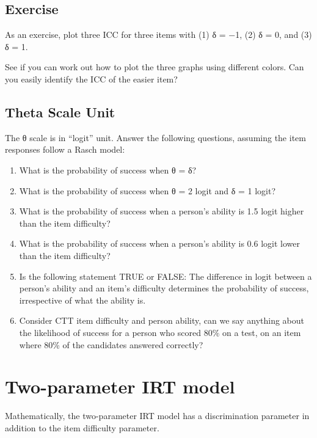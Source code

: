 \documentclass[
  letterpaper,
  DIV=11,
  numbers=noendperiod]{scrreprt}
\providecommand{\tightlist}{%
  \setlength{\itemsep}{0pt}\setlength{\parskip}{0pt}}\usepackage{longtable,booktabs,array}
\begin{document}
\hypertarget{exercise}{%
\section{Exercise}\label{exercise}}

As an exercise, plot three ICC for three items with (1) δ = −1, (2) δ =
0, and (3) δ = 1.

See if you can work out how to plot the three graphs using different
colors. Can you easily identify the ICC of the easier item?

\hypertarget{theta-scale-unit}{%
\section{Theta Scale Unit}\label{theta-scale-unit}}

The θ scale is in ``logit'' unit. Answer the following questions,
assuming the item responses follow a Rasch model:

\begin{enumerate}
\def\labelenumi{\arabic{enumi}.}
\tightlist
\item
  What is the probability of success when θ = δ?
\item
  What is the probability of success when θ = 2 logit and δ = 1 logit?
\item
  What is the probability of success when a person's ability is 1.5
  logit higher than the item difficulty?
\item
  What is the probability of success when a person's ability is 0.6
  logit lower than the item difficulty?
\item
  Is the following statement TRUE or FALSE: The difference in logit
  between a person's ability and an item's difficulty determines the
  probability of success, irrespective of what the ability is.
\item
  Consider CTT item difficulty and person ability, can we say anything
  about the likelihood of success for a person who scored 80\% on a
  test, on an item where 80\% of the candidates answered correctly?
\end{enumerate}

\hypertarget{two-parameter-irt-model}{%
\chapter{Two-parameter IRT model}\label{two-parameter-irt-model}}

Mathematically, the two-parameter IRT model has a discrimination
parameter in addition to the item difficulty parameter.
\end{document}
